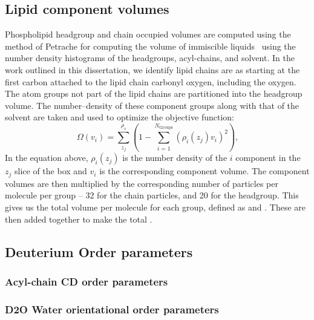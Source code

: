 \subsection{Lipid component volumes}
Phospholipid headgroup and chain occupied volumes are computed using the method of Petrache \etal{} for computing the
volume of immiscible liquids~\cite{petrache:1997} using the number density histograms of the headgroups, acyl-chains, and solvent.
In the work outlined in this dissertation, we identify lipid chains are as starting 
at the first carbon attached to the lipid chain carbonyl oxygen, including the oxygen.
The atom groups not part of the lipid
chains are partitioned into the headgroup volume. 
The number--density of these component groups along with that of the solvent are taken 
and used to optimize the objective function:
\begin{equation}
    \label{eq:volumeobj}
    \Omega(v_i)=\sum^{\rho_s}_{z_j}(1-\sum^{N_{\text{Groups}}}_{i=1}{(\rho_i(z_j)v_i)^2})\text{,}
\end{equation}
In the equation above, $\rho_i(z_j)$ is the number density of the $i$ component in the
$z_j$ slice of the box and $v_i$ is the corresponding component volume. 
The component volumes are then multiplied by the corresponding
number of particles per molecule per group -- 32 for the chain
particles, and 20 for the headgroup. 
This gives us the total volume per molecule for each group, defined as \Vh{} and \Vc{}. These are then
added together to make the total \Vl{}.
\subsection{Deuterium Order parameters}
\subsubsection{Acyl-chain CD order parameters}

\subsubsection{D2O Water orientational order parameters}


